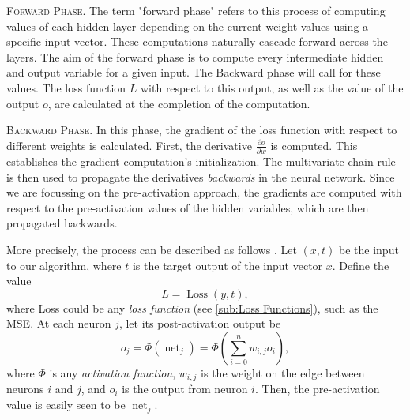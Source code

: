 \documentclass{article}
\DeclareMathOperator{\net}{net}
\begin{document}
    \vspace{4mm}
\noindent\textsc{Forward Phase.} The term "forward phase" refers to this process of computing values of each hidden layer depending on the current weight values using a specific input vector. These computations naturally cascade forward across the layers. The aim of the forward phase is to compute every intermediate hidden and output variable for a given input. The Backward phase will call for these values. The loss function $L$ with respect to this output, as well as the value of the output $o$, are calculated at the completion of the computation. 

 \vspace{4mm}
\noindent\textsc{Backward Phase.} In this phase, the gradient of the loss function with respect to different weights is calculated. First, the derivative $\frac{\partial {o}}{\partial {w}} {}$ is computed. This establishes the gradient computation's initialization. The multivariate chain rule is then used to propagate the derivatives \textit{backwards} in the neural network. Since we are focussing on the pre-activation approach, the gradients are computed with respect to the pre-activation values of the hidden variables, which are then propagated backwards.
  
  More precisely, the process can be described as follows \citep{Dreyfus1990ArtificialNN}. Let $(x,t)$ be the input to our algorithm, where $t$ is the target output of the input vector $x.$ Define the value
  $$L = \operatorname{Loss}(y,t),$$  
  where Loss could be any \textit{loss function} (see \autoref{sub:Loss Functions}), such as the MSE. At each neuron $j$, let its post-activation output be 
  $$o_j = \Phi (\net_j) = \Phi \left( \sum^{n}_{i=0}w_{i,j} o_i  \right) , $$
  where $\Phi$ is any \textit{activation function}, $w_{i,j}$ is the weight on the edge between neurons $i$ and $j$, and $o_i$ is the output from neuron $i.$ Then, the pre-activation value is easily seen to be $\net_j$.
\end{document}
